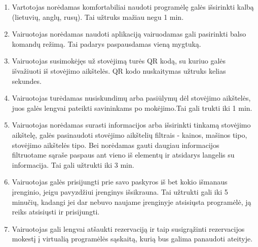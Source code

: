 \documentclass{VUMIFPSkursinis}
\begin{document}
\begin{enumerate}[label = \textbf{PVS\arabic*.}]
	\item Vartotojas norėdamas komfortabiliai naudoti programėlę galės išsirinkti kalbą (lietuvių, anglų, rusų). Tai užtruks mažiau negu 1 min.
	\item Vairuotojas norėdamas naudoti aplikaciją vairuodamas gali pasirinkti balso komandų režimą. Tai padarys paspausdamas vieną mygtuką.
	\item Vairuotojas susimokėjęs už stovėjimą turės QR kodą, su kuriuo galės išvažiuoti iš stovėjimo aikštelės. QR kodo nuskaitymas užtruks kelias sekundes.
	\item Vairuotojas turėdamas nusiskundimų arba pasiūlymų dėl stovėjimo aikštelės, juos galės lengvai pateikti savininkams po mokėjimo.Tai gali trukti iki 1 min.
	\item Vairuotojas norėdamas surasti informacijos arba išsirinkti tinkamą stovėjimo aikštelę, galės pasinaudoti stovėjimo aikštelių filtrais - kainos, mašinos tipo, stovėjimo aikštelės tipo. Bei norėdamas gauti daugiau informacijos filtruotame sąraše paspaus ant vieno iš elementų ir atsidarys langelis su informacija. Tai gali užtrukti iki 3 min.
	\item Vairuotojas galės prisijungti prie savo paskyros iš bet kokio išmanaus įrenginio, jeigu pavyzdžiui įrenginys išsikrauna. Tai užtrukti gali iki 5 minučių, kadangi jei dar nebuvo naujame įrenginyje atsisiųsta programėlė, ją reiks atsisiųsti ir prisijungti.
	\item Vairuotojas gali lengvai atšaukti rezervaciją ir taip susigrąžinti rezervacijos mokestį į virtualią programėlės sąskaitą, kurią bus galima panaudoti ateityje.

\end{enumerate}
\end{document}
